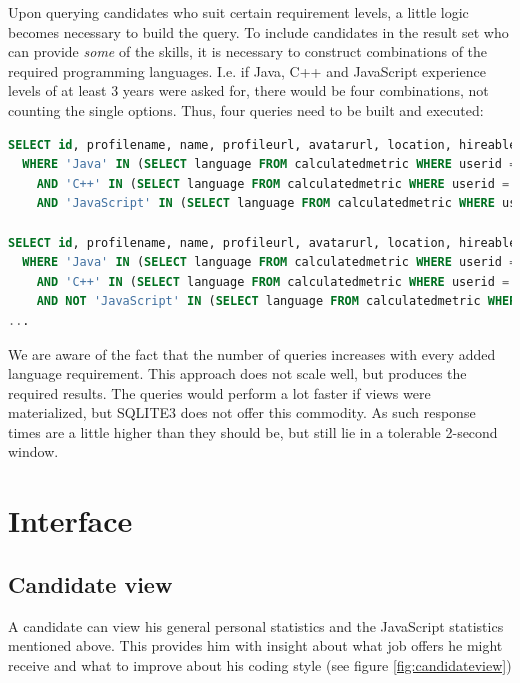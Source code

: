 Upon querying candidates who suit certain requirement levels, a little logic becomes necessary to build the query. To include candidates in the result set who can provide \textit{some} of the skills, it is necessary to construct combinations of the required programming languages. I.e. if Java, C++ and JavaScript experience levels of at least 3 years were asked for, there would be four combinations, not counting the single options.
Thus, four queries need to be built and executed:

\begin{minipage}{\linewidth}
\begin{lstlisting}[language=SQL, frame=false]
SELECT id, profilename, name, profileurl, avatarurl, location, hireable, followers, following FROM users u
  WHERE 'Java' IN (SELECT language FROM calculatedmetric WHERE userid = u.id AND timespan >= 360*1.5)
    AND 'C++' IN (SELECT language FROM calculatedmetric WHERE userid = u.id AND timespan >= 360*1.5)
    AND 'JavaScript' IN (SELECT language FROM calculatedmetric WHERE userid = u.id AND timespan >= 360*1.5)

SELECT id, profilename, name, profileurl, avatarurl, location, hireable, followers, following FROM users u
  WHERE 'Java' IN (SELECT language FROM calculatedmetric WHERE userid = u.id AND timespan >= 360*1.5)
    AND 'C++' IN (SELECT language FROM calculatedmetric WHERE userid = u.id AND timespan >= 360*1.5)
    AND NOT 'JavaScript' IN (SELECT language FROM calculatedmetric WHERE userid = u.id AND timespan >= 360*1.5)
...
\end{lstlisting}
\end{minipage}

We are aware of the fact that the number of queries increases with every added language requirement. This approach does not scale well, but produces the required results. The queries would perform a lot faster if views were materialized, but SQLITE3 does not offer this commodity. As such response times are a little higher than they should be, but still lie in a tolerable 2-second window.

\section{Interface}
\subsection{Candidate view}
A candidate can view his general personal statistics and the JavaScript statistics
mentioned above. This provides him with insight about what job offers he might
receive and what to improve about his coding style (see figure \ref{fig:candidateview})

